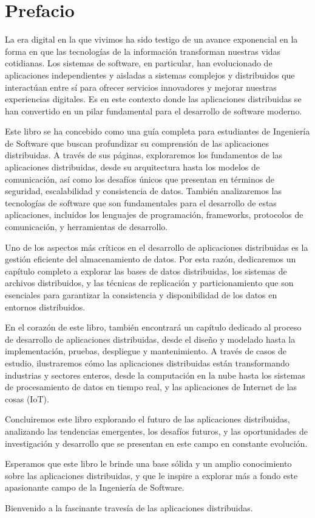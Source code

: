 \chapter*{Prefacio}

\noindent
La era digital en la que vivimos ha sido testigo de un avance exponencial en la forma en que las tecnologías de la información transforman nuestras vidas cotidianas. Los sistemas de software, en particular, han evolucionado de aplicaciones independientes y aisladas a sistemas complejos y distribuidos que interactúan entre sí para ofrecer servicios innovadores y mejorar nuestras experiencias digitales. Es en este contexto donde las aplicaciones distribuidas se han convertido en un pilar fundamental para el desarrollo de software moderno.

Este libro se ha concebido como una guía completa para estudiantes de Ingeniería de Software que buscan profundizar su comprensión de las aplicaciones distribuidas. A través de sus páginas, exploraremos los fundamentos de las aplicaciones distribuidas, desde su arquitectura hasta los modelos de comunicación, así como los desafíos únicos que presentan en términos de seguridad, escalabilidad y consistencia de datos. También analizaremos las tecnologías de software que son fundamentales para el desarrollo de estas aplicaciones, incluidos los lenguajes de programación, frameworks, protocolos de comunicación, y herramientas de desarrollo.

Uno de los aspectos más críticos en el desarrollo de aplicaciones distribuidas es la gestión eficiente del almacenamiento de datos. Por esta razón, dedicaremos un capítulo completo a explorar las bases de datos distribuidas, los sistemas de archivos distribuidos, y las técnicas de replicación y particionamiento que son esenciales para garantizar la consistencia y disponibilidad de los datos en entornos distribuidos.

En el corazón de este libro, también encontrará un capítulo dedicado al proceso de desarrollo de aplicaciones distribuidas, desde el diseño y modelado hasta la implementación, pruebas, despliegue y mantenimiento. A través de casos de estudio, ilustraremos cómo las aplicaciones distribuidas están transformando industrias y sectores enteros, desde la computación en la nube hasta los sistemas de procesamiento de datos en tiempo real, y las aplicaciones de Internet de las cosas (IoT).

Concluiremos este libro explorando el futuro de las aplicaciones distribuidas, analizando las tendencias emergentes, los desafíos futuros, y las oportunidades de investigación y desarrollo que se presentan en este campo en constante evolución.

Esperamos que este libro le brinde una base sólida y un amplio conocimiento sobre las aplicaciones distribuidas, y que le inspire a explorar más a fondo este apasionante campo de la Ingeniería de Software.

Bienvenido a la fascinante travesía de las aplicaciones distribuidas.